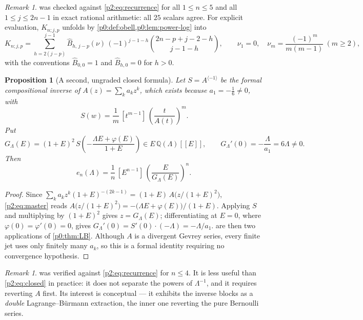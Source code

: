 \documentclass[11pt,a4paper,oneside]{book}
\theoremstyle{plain}
\newtheorem{proposition}[theorem]{Proposition}
\theoremstyle{definition}
\theoremstyle{remark}
\newtheorem{remark}[theorem]{Remark}
\newcommand{\Rat}{\mathbb{Q}}
\newcommand{\Coef}[1]{[#1]\,}
\newcommand{\OB}{\widehat{B}}
\begin{document}
\begin{remark}
\label{p2:rem:closed-checked}
 was checked against \cref{p2:eq:recurrence} for all
\(1\le n\le5\) and all \(1\le j\le2n-1\) in exact rational arithmetic: all
\(25\) scalars agree.  For explicit evaluation, \(K_{n;j,p}\) unfolds by
\cref{p0:def:obell,p0:lem:power-log} into
\[
 K_{n;j,p}=\sum_{h=2(j-p)}^{j-1}\OB_{h,\,j-p}(\nu)\,(-1)^{j-1-h}
 \binom{2n-p+j-2-h}{j-1-h},
 \qquad
 \nu_1=0,\quad \nu_m=\frac{(-1)^m}{m(m-1)}\ (m\ge2),
\]
with the conventions \(\OB_{0,0}=1\) and \(\OB_{h,0}=0\) for \(h>0\).
\end{remark}

\begin{proposition}[A second, ungraded closed formula]
\label{p2:prop:lagrange-closed}
Let \(S=A^{\langle-1\rangle}\) be the formal compositional inverse of
\(A(z)=\sum_ka_kz^k\), which exists because \(a_1=-\tfrac16\ne0\), with
\begin{equation}
 \Coef{w^m}S(w)=\frac1m\,\Coef{t^{m-1}}\left(\frac t{A(t)}\right)^m .
 \label{p2:eq:S-lagrange}
\end{equation}
Put
\begin{equation}
 G_\Lambda(E)=(1+E)^2\,
 S\!\left(-\frac{\Lambda E+\varphi(E)}{1+E}\right)
 \in E\,\Rat(\Lambda)[[E]],
 \qquad G_\Lambda'(0)=-\frac\Lambda{a_1}=6\Lambda\ne0 .
 \label{p2:eq:G-Lambda}
\end{equation}
Then
\begin{equation}
 e_n(\Lambda)=\frac1n\,\Coef{E^{n-1}}
 \left(\frac E{G_\Lambda(E)}\right)^{n} .
 \label{p2:eq:lagrange-closed}
\end{equation}
\end{proposition}

\begin{proof}
Since \(\sum_ka_kz^k(1+E)^{-(2k-1)}=(1+E)\,A\bigl(z/(1+E)^2\bigr)\),
\cref{p2:eq:master} reads
\(A\bigl(z/(1+E)^2\bigr)=-\bigl(\Lambda E+\varphi(E)\bigr)/(1+E)\).  Applying
\(S\) and multiplying by \((1+E)^2\) gives \(z=G_\Lambda(E)\); differentiating
at \(E=0\), where \(\varphi(0)=\varphi'(0)=0\), gives
\(G_\Lambda'(0)=S'(0)\cdot(-\Lambda)=-\Lambda/a_1\).
 are then two applications of
\cref{p0:thm:LB}.  Although \(A\) is a divergent Gevrey series, every finite
jet uses only finitely many \(a_k\), so this is a formal identity requiring no
convergence hypothesis.
\end{proof}

\begin{remark}
 was verified against \cref{p2:eq:recurrence} for
\(n\le4\).  It is less useful than \cref{p2:eq:closed} in practice: it does not
separate the powers of \(\Lambda^{-1}\), and it requires reverting \(A\)
first.  Its interest is conceptual --- it exhibits the inverse blocks as a
\emph{double} Lagrange--B\"urmann extraction, the inner one reverting the pure
Bernoulli series.
\end{remark}
\end{document}
